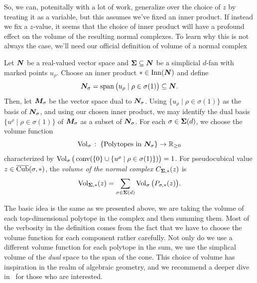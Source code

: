 \documentclass[12pt,oneside]{../../sfsuthesis}
\begin{document}
So, we can, potenitally with a lot of work, generalize over the choice of \( z \) by treating it as a variable, but this assumes we've fixed an inner product.
If instead we fix a \( z \)-value, it seems that the choice of inner product will have a profound effect on the volume of the resulting normal complexes.
To learn why this is not always the case, we'll need our official definition of volume of a normal complex
\begin{definition}\th\label{def:volNormalComplex}
    Let \( \bm{N} \) be a real-valued vector space and \( {\bm{\Sigma}} \subseteq \bm{N} \) be a simplicial \( d \)-fan with marked points \( u_\rho \).
    Choose an inner product \( \ast \in \operatorname{Inn}(\bm{N}) \) and define
    \[
        \bm{N}_\sigma = \operatorname{span}\big(u_\rho \; | \; \rho \in \sigma(1)\big) \subseteq \bm{N}.
    \]
    Then, let \( \bm{M}_\sigma \) be the vector space dual to \( \bm{N}_\sigma \).
    Using \( \{ u_\rho \; | \; \rho \in \sigma(1) \} \) as the basis of \( \bm{N}_\sigma \), and using our chosen inner product, we may identify the dual basis \( \{ u^\rho \; | \; \rho \in \sigma(1) \} \) of \( \bm{M}_\sigma \) as a subset of \( \bm{N}_\sigma \).
    For each \( \sigma \in {\bm{\Sigma}}(d) \), we choose the volume function
    \[
        \operatorname{Vol}_\sigma \,:\; \{\text{Polytopes in \( \bm{N}_\sigma \)} \}  \to \mathbb{R}_{\geq 0}
    \]
    characterized by \( \operatorname{Vol}_\sigma\big( \operatorname{conv}( \{0\} \cup \{u^\rho \; | \; \rho \in \sigma(1)\})\big) = 1 \).
    For pseudocubical value \( z \in \operatorname{\overline{Cub}}(\sigma, \ast) \), the \emph{volume of the normal complex} \(  C_{{\bm{\Sigma}}, \ast}(z) \) is
    \[
        \operatorname{Vol}_{{\bm{\Sigma}}, \ast}(z) = \sum_{\sigma \in {\bm{\Sigma}}(d)} \operatorname{Vol}_\sigma\big(P_{\sigma, \ast}(z)\big).
    \]
\end{definition}

The basic idea is the same as we presented above, we are taking the volume of each top-dimensional polytope in the complex and then summing them.
Most of the verbosity in the definition comes from the fact that we have to choose the volume function for each component rather carefully.
Not only do we use a different volume function for each polytope in the sum, we use the simplical volume of the \textit{dual} space to the span of the cone.
This choice of volume has inspiration in the realm of algebraic geometry, and we recommend a deeper dive in~\cite{nathansonTropicalFansNormal2023} for those who are interested.
\end{document}
